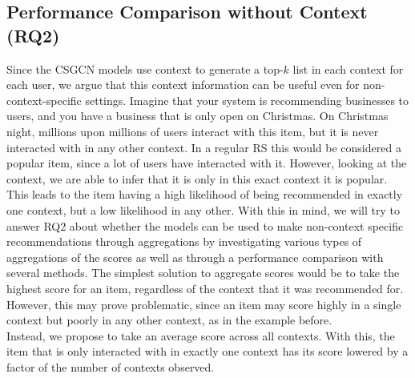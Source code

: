 \subsection{Performance Comparison without Context (RQ2)}\label{subsec:rq2}
Since the CSGCN models use context to generate a top-$k$ list in each context for each user, we argue that this context information can be useful even for non-context-specific settings.
Imagine that your system is recommending businesses to users, and you have a business that is only open on Christmas.
On Christmas night, millions upon millions of users interact with this item, but it is never interacted with in any other context.
In a regular RS this would be considered a popular item, since a lot of users have interacted with it.
However, looking at the context, we are able to infer that it is only in this exact context it is popular.
This leads to the item having a high likelihood of being recommended in exactly one context, but a low likelihood in any other.
With this in mind, we will try to answer RQ2 about whether the models can be used to make non-context specific recommendations through aggregations by investigating various types of aggregations of the scores as well as through a performance comparison with several methods.
The simplest solution to aggregate scores would be to take the highest score for an item, regardless of the context that it was recommended for.
However, this may prove problematic, since an item may score highly in a single context but poorly in any other context, as in the example before.\\
Instead, we propose to take an average score across all contexts.
With this, the item that is only interacted with in exactly one context has its score lowered by a factor of the number of contexts observed.

